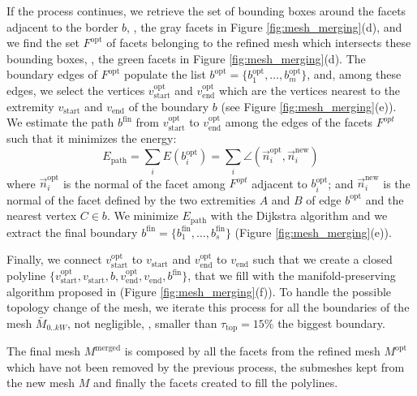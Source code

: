 If the process continues, we retrieve the set of bounding boxes around the facets adjacent to the border $\mathit{b}$, \ie, the gray facets in Figure \ref{fig:mesh_merging}(d), and we find the set $\mathit{F}^{\text{opt}}$ of facets  belonging to the refined mesh which intersects these bounding boxes, \eg, the green facets  in Figure \ref{fig:mesh_merging}(d).
The boundary edges of $\mathit{F}^{\text{opt}}$ populate the list  $\mathit{b}^{\text{opt}} = \{b_1^{\text{opt}}, \dots,  b_m^{\text{opt}}\}$, and, among these edges, we select the vertices  $v_{\text{start}}^{\text{opt}}$ and $v_{\text{end}}^{\text{opt}}$ which are the vertices nearest to the extremity $v_{\text{start}}$ and  $v_{\text{end}}$ of the boundary $\mathit{b}$ (see Figure \ref{fig:mesh_merging}(e)). 
We estimate the path  $\mathit{b}^{\text{fin}}$ from $v_{\text{start}}^{\text{opt}}$ to $v_{\text{end}}^{\text{opt}}$ among the edges of the facets  $\mathit{F}^{opt}$ such that it minimizes the energy:
\begin{equation}
  E_{\text{path}} = \sum_i E(b_i^{\text{opt}})= \sum_i \angle (\overrightarrow{n}_i^{\text{opt}},\overrightarrow{n}_i^{\text{new}})
\end{equation}
where $\overrightarrow{n}_i^{\text{opt}}$ is the normal of the facet among $\mathit{F}^{opt}$ adjacent to  $b_i^{\text{opt}}$; and
$\overrightarrow{n}_i^{\text{new}}$ is the normal of the facet defined by the two extremities $A$ and $B$ of edge ${b}^{\text{opt}}$ and the nearest vertex $C \in \mathit{b}$.
We minimize $E_{\text{path}}$ with the Dijkstra algorithm  and we extract the final boundary $\mathit{b}^{\text{fin}} = \{ b_1^{\text{fin}}, \dots, b_s^{\text{fin}}\}$ (Figure \ref{fig:mesh_merging}(e)).

Finally, we connect $v_{\text{start}}^{\text{opt}}$ to $v_{\text{start}}$  and $v_{\text{end}}^{\text{opt}}$ to  $v_{\text{end}}$ such that we create a closed polyline $\{v_{\text{start}}^{\text{opt}},  v_{\text{start}}, \mathit{b}, v_{\text{end}}^{\text{opt}}, v_{\text{end}}, \mathit{b}^{\text{fin}}\}$, that we fill with the manifold-preserving algorithm proposed in \cite{liepa2003filling}  (Figure \ref{fig:mesh_merging}(f)). 
To handle the possible topology change of the mesh, we iterate this process for all the boundaries of the mesh  $\mathit{\bar{M}}_{0..kW}$, not negligible, \ie, smaller than $\tau_{\text{top}}= 15\%$ the biggest boundary.

The final mesh $\mathit{M}^{\text{merged}}$ is composed by all the facets from the refined mesh $\mathit{M}^{\text{opt}}$ which have not been removed by the previous process, the submeshes kept from the new mesh $\mathit{M}$ and finally the facets created to fill the polylines.



